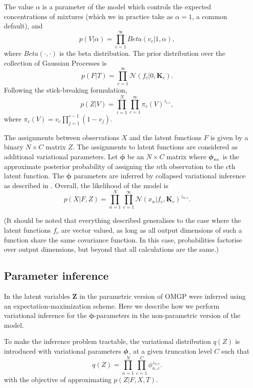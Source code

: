 The value $ \alpha $ is a parameter of the model which controls the expected concentrations of mixtures (which we in practice take as $ \alpha = 1 $, a common default), and
\[ p(V | \alpha) = \prod_{c=1}^\infty  Beta(v_c | 1, \alpha), \]
where $ Beta(\cdot, \cdot) $ is the beta distribution. The prior distribution over the collection of Gaussian Processes is
\[ p(F | T) = \prod_{c=1}^\infty \mathcal{N}(f_c | 0, \bm{K}_c). \]
Following the stick-breaking formulation,
\[ p(Z | V) = \prod_{i=1}^N \prod_{c=1}^{\infty} \pi_c(V)^{z_{i,c}}, \]
where $ \pi_c(V) = v_c \prod_{j=1}^{c - 1} (1 - v_j) $.

The assignments between observations $ X $ and the latent functions $ F $ is given by a binary $ N \times C $ matrix $ Z $. The assignments to latent functions are considered as additional variational parameters. Let $ \bm{\phi} $ be an $ N \times C $ matrix where $ \mbox{\boldmath $\phi$}_{nc} $ is the approximate posterior probability of assigning the $ n $th observation to the $ c $th latent function. The $ \bm{\phi} $ parameters are inferred by collapsed variational inference as described in \cite{Hensman2012-kr}. Overall, the likelihood of the model is
\[
p(X | F, Z) = \prod_{n=1}^N \prod_{c=1}^{\infty} \mathcal{N}(x_n | f_c, \bm{K}_c )^{z_{n, c}}.
\]

(It should be noted that everything described generalises to the case where the latent functions
$ f_c $ are vector valued, as long as all output dimensions of such a function share the same
covariance function. In this case, probabilities factorise over output dimensions, but beyond that
all calculations are the same.)

\subsection{Parameter inference}

In \cite{Lazaro-Gredilla2012-ta} the latent variables $ \mathbf{Z} $ in the parametric version of OMGP were inferred using an expectation-maximization scheme. Here we describe how we perform variational inference for the $ \bm{\phi} $-parameters in the non-parametric version of the model.

To make the inference problem tractable, the variational distribution $ q(Z) $ is introduced with variational parameters $ \mbox{\boldmath $\phi$} $, at a given truncation level $ C $ such that
\[ q(Z) = \prod_{n=1}^N \prod_{c=1}^C \phi_{n,c}^{z_{n,c}}. \]
with the objective of approximating $ p(Z | F, X, T) $.

